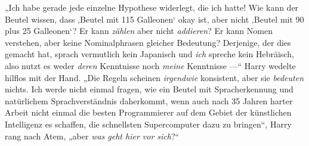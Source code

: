 „Ich habe gerade jede einzelne Hypothese widerlegt, die ich hatte! Wie kann der Beutel wissen, dass ‚Beutel mit 115 Galleonen‘ okay ist, aber nicht ‚Beutel mit 90 plus 25 Galleonen‘? Er kann \emph{zählen} aber nicht \emph{addieren}? Er kann Nomen verstehen, aber keine Nominalphrasen gleicher Bedeutung? Derjenige, der dies gemacht hat, sprach vermutlich kein Japanisch und \emph{ich} spreche kein Hebräisch, also nutzt es weder \emph{deren} Kenntnisse noch \emph{meine} Kenntnisse —“ Harry wedelte hilflos mit der Hand.
„Die Regeln scheinen \emph{irgendwie} konsistent, aber sie \emph{bedeuten} nichts. Ich werde nicht einmal fragen, wie ein Beutel mit Spracherkennung und natürlichem Sprachverständnis daherkommt, wenn auch nach 35 Jahren harter Arbeit nicht einmal die besten Programmierer auf dem Gebiet der künstlichen Intelligenz es schaffen, die schnellsten Supercomputer dazu zu bringen“, Harry rang nach Atem, „aber \emph{was geht hier vor sich}?“


